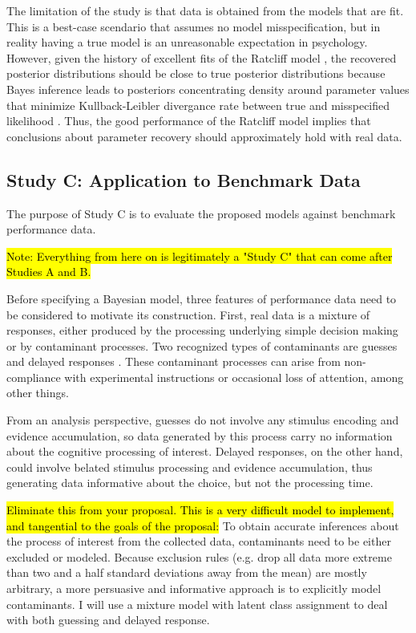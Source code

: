 \documentclass[12pt]{article}
\newcommand{\trish}[1]{\textrm{\hl{#1}}}
\begin{document}
The limitation of the study is that data is obtained from the models that are fit. This is a best-case scendario that assumes no model misspecification, but in reality having a true model is an unreasonable expectation in psychology. However, given the history of excellent fits of the Ratcliff model \citep{RatMck2008,Wag2009}, the recovered posterior distributions should be close to true posterior distributions because Bayes inference leads to posteriors concentrating density around parameter values that minimize  Kullback-Leibler divergance rate between true and misspecified likelihood \citep{BlaWal2013,GelSha2013}. Thus, the good performance of the Ratcliff model implies that conclusions about parameter recovery should approximately hold with real data.

\subsection{Study C: Application to Benchmark Data}


The purpose of Study C is to evaluate the proposed models
against benchmark performance data. 

\trish{Note: Everything from here on is legitimately a "Study C" that
can come after Studies A and B.}
    
Before specifying a Bayesian model, three features of performance data
need to be considered to motivate its construction. First, real data
is a mixture of responses, either produced by the processing
underlying simple decision making or by contaminant processes. Two
recognized types of contaminants are guesses and delayed responses
\citep{Rat1993,RatTue2002,VanTue2007,VanTue2008,
VanTue2011,CraPer2010}. These contaminant processes can arise from
non-compliance with experimental instructions or occasional loss of
attention, among other things.
    
From an analysis perspective, guesses do not involve any
stimulus encoding and evidence accumulation, so data generated by this
process carry no information about the cognitive processing of
interest. Delayed responses, on the other hand, could involve
belated stimulus processing and evidence accumulation, thus generating
data informative about the choice, but not the processing time.
    
\trish{Eliminate this from your proposal.  This is a very difficult
model to implement, and tangential to the goals of the proposal:} To
obtain accurate inferences about the process of interest from the
collected data, contaminants need to be either excluded or
modeled. Because exclusion rules (e.g. drop all data more extreme than
two and a half standard deviations away from the mean) are mostly
arbitrary, a more persuasive and informative approach is to explicitly
model contaminants. I will use a mixture model with latent class
assignment to deal with both guessing and delayed response.
    
\end{document}
